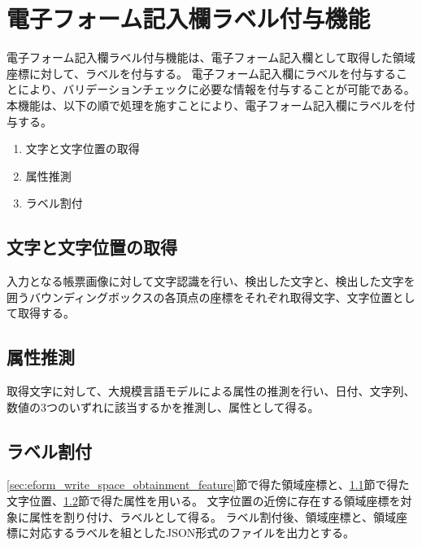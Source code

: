 \section{電子フォーム記入欄ラベル付与機能}\label{sec:label_link}
電子フォーム記入欄ラベル付与機能は、電子フォーム記入欄として取得した領域座標に対して、ラベルを付与する。
電子フォーム記入欄にラベルを付与することにより、バリデーションチェックに必要な情報を付与することが可能である。
本機能は、以下の順で処理を施すことにより、電子フォーム記入欄にラベルを付与する。

\begin{enumerate}
  \item 文字と文字位置の取得
  \item 属性推測
  \item ラベル割付
\end{enumerate}

\subsection{文字と文字位置の取得}\label{subsec:char_and_bbox_obtainment}
入力となる帳票画像に対して文字認識を行い、検出した文字と、検出した文字を囲うバウンディングボックスの各頂点の座標をそれぞれ取得文字、文字位置として取得する。

\subsection{属性推測}\label{subsec:att_prediction}
取得文字に対して、大規模言語モデルによる属性の推測を行い、日付、文字列、数値の3つのいずれに該当するかを推測し、属性として得る。

\subsection{ラベル割付}\label{subsec:label_link}
\ref{sec:eform_write_space_obtainment_feature}節で得た領域座標と、\ref{subsec:char_and_bbox_obtainment}節で得た文字位置、\ref{subsec:att_prediction}節で得た属性を用いる。
文字位置の近傍に存在する領域座標を対象に属性を割り付け、ラベルとして得る。
ラベル割付後、領域座標と、領域座標に対応するラベルを組としたJSON形式のファイルを出力とする。
